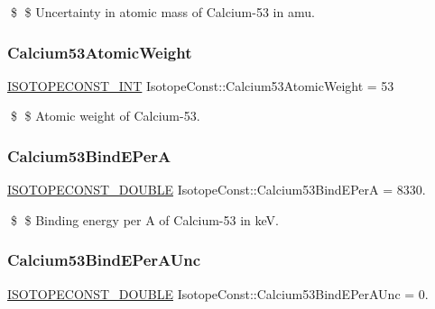 \$ \$ Uncertainty in atomic mass of Calcium-\/53 in amu. \mbox{\label{group___isotope_const-_calcium-_ca53_gac76f80970411b4d5e64e327587920ee5}} 
\subsubsection{\texorpdfstring{Calcium53\+Atomic\+Weight}{Calcium53AtomicWeight}}
{\footnotesize\ttfamily \mbox{\hyperlink{group___isotope_const-_macros_ga5f18360b3e99483a35c32d789e62621c}{I\+S\+O\+T\+O\+P\+E\+C\+O\+N\+S\+T\+\_\+\+I\+NT}} Isotope\+Const\+::\+Calcium53\+Atomic\+Weight = 53}

\$ \$ Atomic weight of Calcium-\/53. \mbox{\label{group___isotope_const-_calcium-_ca53_gaf7a371d7214a1bab7fb6bd5e4c8d9f07}} 
\subsubsection{\texorpdfstring{Calcium53\+Bind\+E\+PerA}{Calcium53BindEPerA}}
{\footnotesize\ttfamily \mbox{\hyperlink{group___isotope_const-_macros_ga8f45a7272ce02c0b4c65c44636ed719a}{I\+S\+O\+T\+O\+P\+E\+C\+O\+N\+S\+T\+\_\+\+D\+O\+U\+B\+LE}} Isotope\+Const\+::\+Calcium53\+Bind\+E\+PerA = 8330.}

\$ \$ Binding energy per A of Calcium-\/53 in keV. \mbox{\label{group___isotope_const-_calcium-_ca53_ga0e3f7a8b00eb2e5bd9720ba34600dba4}} 
\subsubsection{\texorpdfstring{Calcium53\+Bind\+E\+Per\+A\+Unc}{Calcium53BindEPerAUnc}}
{\footnotesize\ttfamily \mbox{\hyperlink{group___isotope_const-_macros_ga8f45a7272ce02c0b4c65c44636ed719a}{I\+S\+O\+T\+O\+P\+E\+C\+O\+N\+S\+T\+\_\+\+D\+O\+U\+B\+LE}} Isotope\+Const\+::\+Calcium53\+Bind\+E\+Per\+A\+Unc = 0.}

